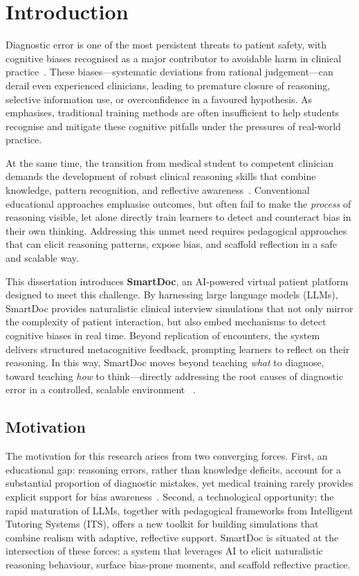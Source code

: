 \chapter{Introduction} 
\label{chap:chap1}

Diagnostic error is one of the most persistent threats to patient safety, with
cognitive biases recognised as a major contributor to avoidable harm in clinical
practice~\parencite{graber_diagnostic_2005}. These biases—systematic deviations
from rational judgement—can derail even experienced clinicians, leading to
premature closure of reasoning, selective information use, or overconfidence in
a favoured hypothesis. As \textcite{croskerry_importance_2003} emphasises,
traditional training methods are often insufficient to help students recognise
and mitigate these cognitive pitfalls under the pressures of real-world practice.

At the same time, the transition from medical student to competent clinician
demands the development of robust clinical reasoning skills that combine
knowledge, pattern recognition, and reflective awareness~\parencite{audetat_diagnosis_2017}.
Conventional educational approaches emphasise outcomes, but often fail to make
the \emph{process} of reasoning visible, let alone directly train learners to
detect and counteract bias in their own thinking. Addressing this unmet need
requires pedagogical approaches that can elicit reasoning patterns, expose bias,
and scaffold reflection in a safe and scalable way.

This dissertation introduces \textbf{SmartDoc}, an AI-powered virtual patient
platform designed to meet this challenge. By harnessing large language models
(LLMs), SmartDoc provides naturalistic clinical interview simulations that not
only mirror the complexity of patient interaction, but also embed mechanisms to
detect cognitive biases in real time. Beyond replication of encounters, the
system delivers structured metacognitive feedback, prompting learners to reflect
on their reasoning. In this way, SmartDoc moves beyond teaching \emph{what} to
diagnose, toward teaching \emph{how} to think—directly addressing the root
causes of diagnostic error in a controlled, scalable environment
~\parencite{mamede_structure_2004,berge_cognitive_2013}.

\section{Motivation} 
\label{sec:se1}

The motivation for this research arises from two converging forces. First, an
educational gap: reasoning errors, rather than knowledge deficits, account for a
substantial proportion of diagnostic mistakes, yet medical training rarely
provides explicit support for bias awareness~\parencite{berge_cognitive_2013}.
Second, a technological opportunity: the rapid maturation of LLMs, together with
pedagogical frameworks from Intelligent Tutoring Systems (ITS), offers a new
toolkit for building simulations that combine realism with adaptive, reflective
support. SmartDoc is situated at the intersection of these forces: a system that
leverages AI to elicit naturalistic reasoning behaviour, surface bias-prone
moments, and scaffold reflective practice.

